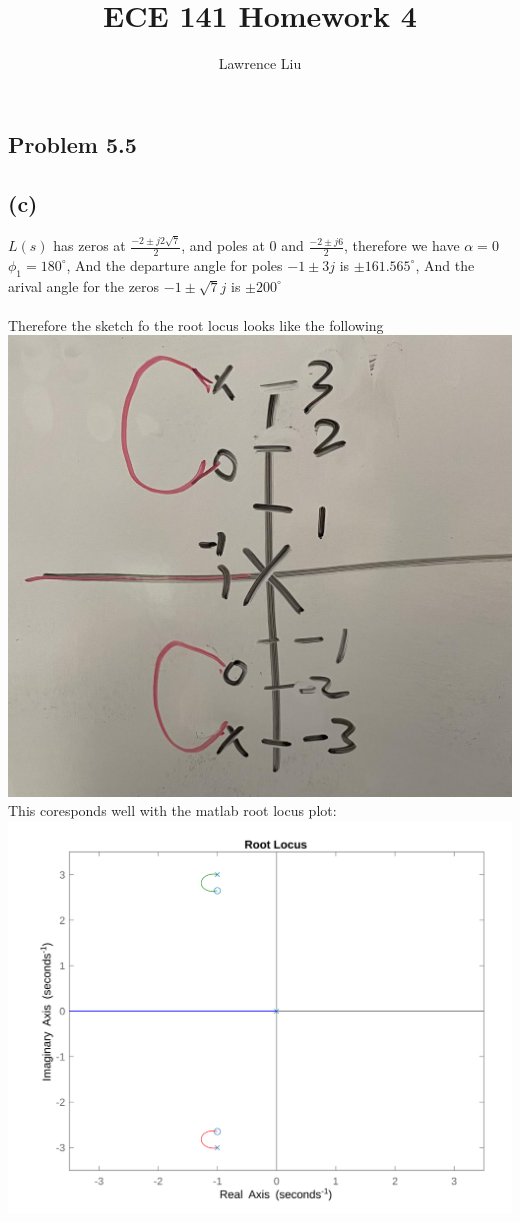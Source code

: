 \documentclass[12pt]{article}
\title{ECE 141 Homework 4}
\author{Lawrence Liu}
\begin{document}
\maketitle
\subsection*{Problem 5.5}
\subsection*{(c)}
$L(s)$ has zeros at $\frac{-2\pm j2\sqrt{7}}{2}$, and poles at $0$ and $\frac{-2\pm j6}{2}$, therefore we have $\alpha=0$
$\phi_{1}=180^{\circ}$, 
And the departure angle for poles $-1\pm3j$ is $\pm161.565^{\circ}$, And the arival angle for the zeros $-1\pm\sqrt{7}j$ is $\pm200^{\circ}$\\\\
Therefore the sketch fo the root locus looks like the following
\\
\includegraphics[scale=.15]{Problem1Sketch1.jpg}
\\This coresponds well with the matlab root locus plot:\\
\includegraphics[scale=.15]{Problem1Matlab1.png}
\end{document}

